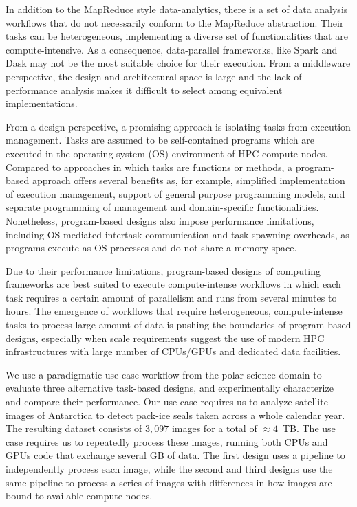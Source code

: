 \label{ch:designs}

In addition to the MapReduce style data-analytics, there is a set of data analysis workflows that do not necessarily conform to the MapReduce abstraction.
Their tasks can be heterogeneous, implementing a diverse set of functionalities that are compute-intensive.
As a consequence, data-parallel frameworks, like Spark and Dask may not be the most suitable choice for their execution.
From a middleware perspective, the design and architectural space is large and the lack of performance analysis makes it difficult to select among equivalent implementations.

From a design perspective, a promising approach is isolating tasks from execution management.
Tasks are assumed to be self-contained programs which are executed in the operating system (OS) environment of HPC compute nodes.
Compared to approaches in which tasks are functions or methods, a program-based approach offers several benefits as, for example, simplified implementation of execution management, support of general purpose programming models, and separate programming of management and domain-specific functionalities.
Nonetheless, program-based designs also impose performance limitations, including OS-mediated intertask communication and task spawning overheads, as programs execute as OS processes and do not share a memory space.

Due to their performance limitations, program-based designs of computing frameworks are best suited to execute compute-intense workflows in which each task requires a certain amount of parallelism and runs from several minutes to hours.
The emergence of workflows that require heterogeneous, compute-intense tasks to process large amount of data is pushing the boundaries of program-based designs, especially when scale requirements suggest the use of modern HPC infrastructures with large number of CPUs/GPUs and dedicated data facilities.

We use a paradigmatic use case workflow from the polar science domain to evaluate three alternative task-based designs, and experimentally characterize and compare their performance.
Our use case requires us to analyze satellite images of Antarctica to detect pack-ice seals taken across a whole calendar year.
The resulting dataset consists of $3,097$ images for a total of $\approx4$~TB.
The use case requires us to repeatedly process these images, running both CPUs and GPUs code that exchange several GB of data.
The first design uses a pipeline to independently process each image, while the second and third designs use the same pipeline to process a series of images with differences in how images are bound to available compute nodes.

